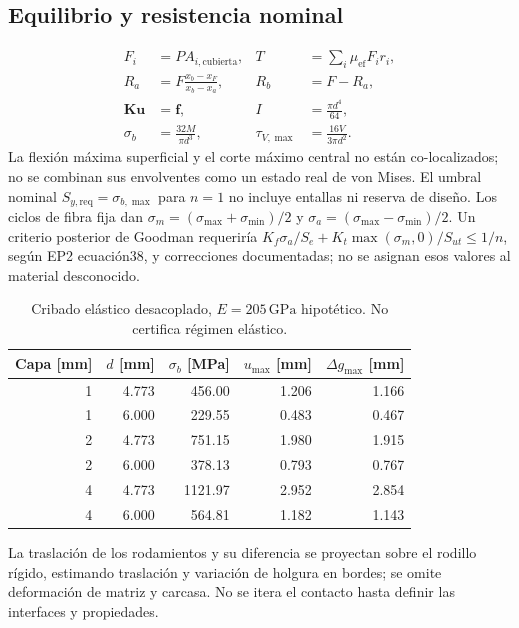 \subsection{Equilibrio y resistencia nominal}
\begin{align}
F_i&=P A_{i,\mathrm{cubierta}},&T&=\sum_i\mu_{\mathrm{ef}}F_i r_i,\\
R_a&=F\frac{x_b-x_F}{x_b-x_a},&R_b&=F-R_a,\\
\mathbf K\mathbf u&=\mathbf f,&I&=\frac{\pi d^4}{64},\\
\sigma_b&=\frac{32M}{\pi d^3},&\tau_{V,\max}&=\frac{16V}{3\pi d^2}.
\end{align}
La flexión máxima superficial y el corte máximo central no están co-localizados;
no se combinan sus envolventes como un estado real de von Mises.
El umbral nominal $S_{y,\mathrm{req}}=\sigma_{b,\max}$ para $n=1$ no incluye entallas ni reserva de diseño.
Los ciclos de fibra fija dan $\sigma_m=(\sigma_{\max}+\sigma_{\min})/2$ y
$\sigma_a=(\sigma_{\max}-\sigma_{\min})/2$. Un criterio posterior de Goodman requeriría
$K_f\sigma_a/S_e+K_t\max(\sigma_m,0)/S_{ut}\leq1/n$, según EP2 ecuación38, y correcciones documentadas;
no se asignan esos valores al material desconocido.
\begin{table}[ht]\centering\begin{tabular}{rrrrr}\toprule
Capa [mm]&$d$ [mm]&$\sigma_b$ [MPa]&$u_{\max}$ [mm]&$\Delta g_{\max}$ [mm]\\\midrule
1 & 4.773 & 456.00 & 1.206 & 1.166\\
1 & 6.000 & 229.55 & 0.483 & 0.467\\
2 & 4.773 & 751.15 & 1.980 & 1.915\\
2 & 6.000 & 378.13 & 0.793 & 0.767\\
4 & 4.773 & 1121.97 & 2.952 & 2.854\\
4 & 6.000 & 564.81 & 1.182 & 1.143\\
\bottomrule\end{tabular}
\caption{Cribado elástico desacoplado, $E=205\,\mathrm{GPa}$ hipotético. No certifica régimen elástico.}
\end{table}
La traslación de los rodamientos y su diferencia se proyectan sobre el rodillo rígido,
estimando traslación y variación de holgura en bordes; se omite deformación de matriz y carcasa.
No se itera el contacto hasta definir las interfaces y propiedades.

